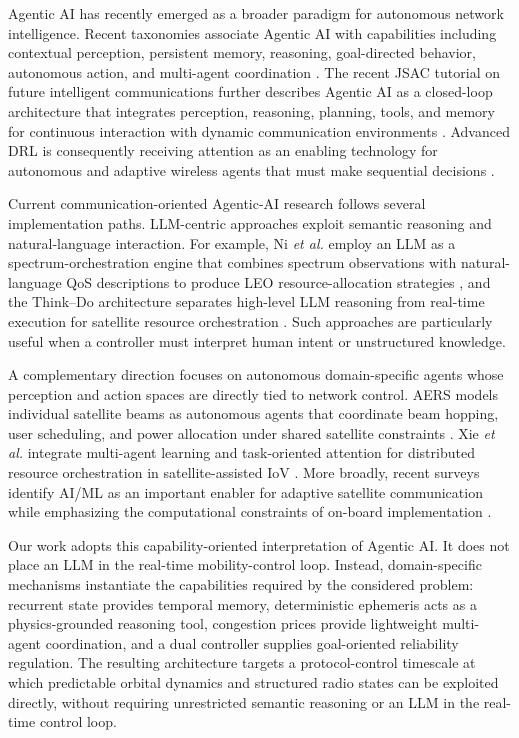\documentclass[journal]{IEEEtran}
\begin{document}
Agentic AI has recently emerged as a broader paradigm for autonomous
network intelligence. Recent taxonomies associate Agentic AI with
capabilities including contextual perception, persistent memory,
reasoning, goal-directed behavior, autonomous action, and multi-agent
coordination \cite{sapkota2026agentic,zhang2026edgeagentic}.
The recent JSAC tutorial on future intelligent communications further
describes Agentic AI as a closed-loop architecture that integrates
perception, reasoning, planning, tools, and memory for continuous
interaction with dynamic communication environments
\cite{jiang2026tutorial}. Advanced DRL is consequently receiving
attention as an enabling technology for autonomous and adaptive
wireless agents that must make sequential decisions
\cite{zheng2026agenticdrl}.

Current communication-oriented Agentic-AI research follows several
implementation paths. LLM-centric approaches exploit semantic
reasoning and natural-language interaction. For example, Ni
\emph{et al.} employ an LLM as a spectrum-orchestration engine that
combines spectrum observations with natural-language QoS descriptions
to produce LEO resource-allocation strategies
\cite{ni2026llmleo}, and the Think--Do architecture separates
high-level LLM reasoning from real-time execution for satellite
resource orchestration \cite{cao2026thinkdo}. Such approaches are
particularly useful when a controller must interpret human intent or
unstructured knowledge.

A complementary direction focuses on autonomous domain-specific agents
whose perception and action spaces are directly tied to network
control. AERS models individual satellite beams as autonomous agents
that coordinate beam hopping, user scheduling, and power allocation
under shared satellite constraints \cite{shen2026aers}. Xie
\emph{et al.} integrate multi-agent learning and task-oriented
attention for distributed resource orchestration in
satellite-assisted IoV \cite{xie2026agenticiov}. More broadly, recent
surveys identify AI/ML as an important enabler for adaptive satellite
communication while emphasizing the computational constraints of
on-board implementation \cite{fontanesi2026aisurvey}.

Our work adopts this capability-oriented interpretation of Agentic AI.
It does not place an LLM in the real-time mobility-control loop.
Instead, domain-specific mechanisms instantiate the capabilities
required by the considered problem: recurrent state provides temporal
memory, deterministic ephemeris acts as a physics-grounded reasoning
tool, congestion prices provide lightweight multi-agent coordination,
and a dual controller supplies goal-oriented reliability regulation.
The resulting architecture targets a protocol-control timescale at
which predictable orbital dynamics and structured radio states can be
exploited directly, without requiring unrestricted semantic reasoning
or an LLM in the real-time control loop.
\end{document}

